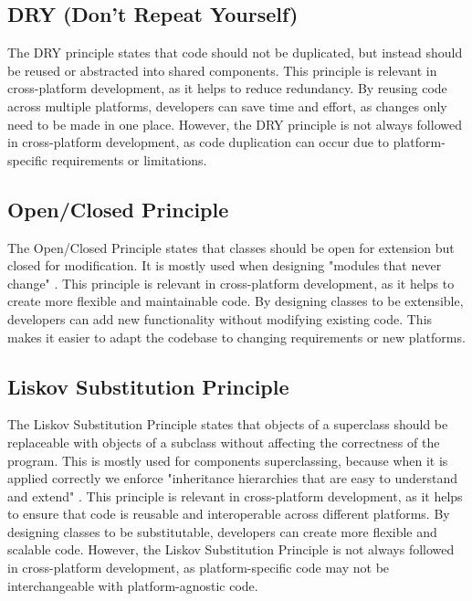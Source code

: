 \subsection{DRY (Don't Repeat Yourself)}
The DRY principle states that code should not be duplicated, but instead should be reused or abstracted into shared components.
This principle is relevant in cross-platform development, as it helps to reduce redundancy.
By reusing code across multiple platforms, developers can save time and effort, as changes only need to be made in one place.
However, the DRY principle is not always followed in cross-platform development, as code duplication can occur due to platform-specific requirements or limitations.

\subsection{Open/Closed Principle}
The Open/Closed Principle states that classes should be open for extension but closed for modification.
It is mostly used when designing "modules that never change" \cite{openClose}.
This principle is relevant in cross-platform development, as it helps to create more flexible and maintainable code.
By designing classes to be extensible, developers can add new functionality without modifying existing code.
This makes it easier to adapt the codebase to changing requirements or new platforms.

\subsection{Liskov Substitution Principle}
The Liskov Substitution Principle states that objects of a superclass should be replaceable with objects of a subclass without affecting the correctness of the program.
This is mostly used for components superclassing, 
because when it is applied correctly we enforce "inheritance hierarchies that are easy to understand and extend" \cite{liskov}.
This principle is relevant in cross-platform development, as it helps to ensure that code is reusable and interoperable across different platforms.
By designing classes to be substitutable, developers can create more flexible and scalable code.
However, the Liskov Substitution Principle is not always followed in cross-platform development, as platform-specific code may not be interchangeable with platform-agnostic code.

